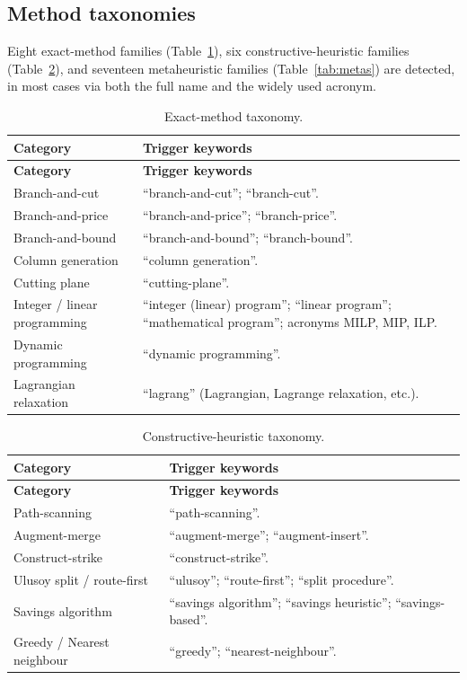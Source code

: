 \documentclass[11pt]{article}
\begin{document}
\subsection{Method taxonomies}

Eight exact-method families (Table~\ref{tab:exact}), six constructive-heuristic
families (Table~\ref{tab:constructive}), and seventeen metaheuristic families
(Table~\ref{tab:metas}) are detected, in most cases via both the full name and the
widely used acronym.

{\small
\begin{longtable}{@{}p{4.3cm}p{9.3cm}@{}}
\caption{Exact-method taxonomy.}\label{tab:exact}\\
\toprule
\textbf{Category} & \textbf{Trigger keywords} \\
\midrule
\endfirsthead
\toprule
\textbf{Category} & \textbf{Trigger keywords} \\
\midrule
\endhead
Branch-and-cut & ``branch-and-cut''; ``branch-cut''. \\
Branch-and-price & ``branch-and-price''; ``branch-price''. \\
Branch-and-bound & ``branch-and-bound''; ``branch-bound''. \\
Column generation & ``column generation''. \\
Cutting plane & ``cutting-plane''. \\
Integer / linear programming &
  ``integer (linear) program''; ``linear program''; ``mathematical program'';
  acronyms MILP, MIP, ILP. \\
Dynamic programming & ``dynamic programming''. \\
Lagrangian relaxation & ``lagrang'' (Lagrangian, Lagrange relaxation, etc.). \\
\bottomrule
\end{longtable}
}

{\small
\begin{longtable}{@{}p{4.3cm}p{9.3cm}@{}}
\caption{Constructive-heuristic taxonomy.}\label{tab:constructive}\\
\toprule
\textbf{Category} & \textbf{Trigger keywords} \\
\midrule
\endfirsthead
\toprule
\textbf{Category} & \textbf{Trigger keywords} \\
\midrule
\endhead
Path-scanning & ``path-scanning''. \\
Augment-merge & ``augment-merge''; ``augment-insert''. \\
Construct-strike & ``construct-strike''. \\
Ulusoy split / route-first & ``ulusoy''; ``route-first''; ``split procedure''. \\
Savings algorithm &
  ``savings algorithm''; ``savings heuristic''; ``savings-based''. \\
Greedy / Nearest neighbour & ``greedy''; ``nearest-neighbour''. \\
\bottomrule
\end{longtable}
}
\end{document}
